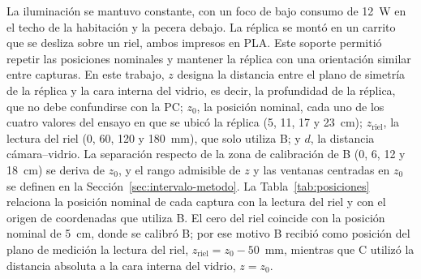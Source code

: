La iluminación se mantuvo constante, con un foco de bajo consumo de 12~W en el techo de la habitación y la pecera debajo. La réplica se montó en un carrito que se desliza sobre un riel, ambos impresos en PLA. Este soporte permitió repetir las posiciones nominales y mantener la réplica con una orientación similar entre capturas. En este trabajo, $z$ designa la distancia entre el plano de simetría de la réplica y la cara interna del vidrio, es decir, la profundidad de la réplica, que no debe confundirse con la PC; $z_0$, la posición nominal, cada uno de los cuatro valores del ensayo en que se ubicó la réplica (5, 11, 17 y 23~cm); $z_{\mathrm{riel}}$, la lectura del riel (0, 60, 120 y 180~mm), que solo utiliza B; y $d$, la distancia cámara--vidrio. La separación respecto de la zona de calibración de B (0, 6, 12 y 18~cm) se deriva de $z_0$, y el rango admisible de $z$ y las ventanas centradas en $z_0$ se definen en la Sección~\ref{sec:intervalo-metodo}. La Tabla~\ref{tab:posiciones} relaciona la posición nominal de cada captura con la lectura del riel y con el origen de coordenadas que utiliza B. El cero del riel coincide con la posición nominal de 5~cm, donde se calibró B; por ese motivo B recibió como posición del plano de medición la lectura del riel, $z_{\mathrm{riel}} = z_0 - 50$~mm, mientras que C utilizó la distancia absoluta a la cara interna del vidrio, $z = z_0$.

